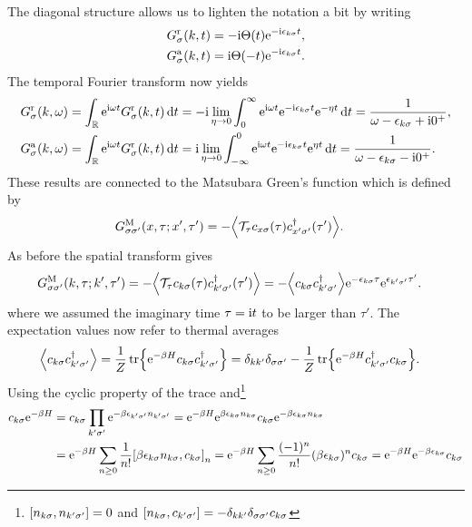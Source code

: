 \documentclass[english, parskip=full]{scrartcl}
\begin{document}
The diagonal structure allows us to lighten the notation a bit by writing
\begin{align}
G^\r_\sigma(k,t) &= -\i\Theta(t) \powe{-\i\epsilon_{k\sigma} t},\\
G^\a_\sigma(k,t) &= \i\Theta(-t) \powe{-\i\epsilon_{k\sigma} t}.
\end{align}
The temporal Fourier transform now yields
\begin{align}
G^\r_\sigma(k,\omega) &= \intr{\powe{\i\omega t} G^\r_\sigma(k,t)}{t} = -\i\lim_{\eta\rightarrow 0} \intx{0}{\infty}{\powe{\i\omega t}\powe{-\i\epsilon_{k\sigma} t} \powe{-\eta t}}{t} = \frac{1}{\omega - \epsilon_{k\sigma} + \i 0^+},\\
G^\a_\sigma(k,\omega) &= \intr{\powe{\i\omega t} G^\r_\sigma(k,t)}{t} = \i\lim_{\eta\rightarrow 0} \intx{-\infty}{0}{\powe{\i\omega t}\powe{-\i\epsilon_{k\sigma} t} \powe{\eta t}}{t} = \frac{1}{\omega - \epsilon_{k\sigma} - \i 0^+}.
\end{align}
These results are connected to the Matsubara Green's function which is defined by
\begin{align}
G^\M_{\sigma\sigma'}(x,\tau;x',\tau') &= -\bra*{\mathcal{T}_\tau c_{x\sigma}(\tau) c_{x'\sigma'}^\dagger(\tau')}.
\end{align}
As before the spatial transform gives
\begin{align}
G^\M_{\sigma\sigma'}(k,\tau;k',\tau') &= -\bra*{\mathcal{T}_\tau c_{k\sigma}(\tau) c_{k'\sigma'}^\dagger(\tau')} = -\bra*{c_{k\sigma} c_{k'\sigma'}^\dagger} \powe{-\epsilon_{k\sigma} \tau} \powe{\epsilon_{k'\sigma'} \tau'}.
\end{align}
where we assumed the imaginary time $\tau = \i t$ to be larger than $\tau'$.
The expectation values now refer to thermal averages
\begin{align}
\bra*{c_{k\sigma} c_{k'\sigma'}^\dagger} &= \frac{1}{Z} \tr\klc*{\powe{-\beta H} c_{k\sigma} c_{k'\sigma'}^\dagger} = \delta_{kk'} \delta_{\sigma\sigma'} - \frac{1}{Z}\tr\klc*{\powe{-\beta H} c_{k'\sigma'}^\dagger c_{k\sigma}}.
\end{align}
Using the cyclic property of the trace and\footnote{$\klb*{n_{k\sigma}, n_{k'\sigma'}} = 0$ and $\klb*{n_{k\sigma}, c_{k'\sigma'}} = -\delta_{kk'}\delta_{\sigma\sigma'} c_{k\sigma}$}
\begin{align}
c_{k\sigma} \powe{-\beta H} &= c_{k\sigma} \prod_{k'\sigma'} \powe{-\beta \epsilon_{k'\sigma'} n_{k'\sigma'}} = \powe{-\beta H} \powe{\beta \epsilon_{k\sigma} n_{k\sigma}} c_{k\sigma} \powe{-\beta \epsilon_{k\sigma} n_{k\sigma}} \\
&= \powe{-\beta H} \sum_{n\ge 0} \frac{1}{n!} \klb*{\beta \epsilon_{k\sigma} n_{k\sigma}, c_{k\sigma}}_n = \powe{-\beta H} \sum_{n\ge 0} \frac{(-1)^n}{n!} (\beta\epsilon_{k\sigma})^n c_{k\sigma} = \powe{-\beta H} \powe{-\beta \epsilon_{k\sigma}} c_{k\sigma}
\end{align}
\end{document}
